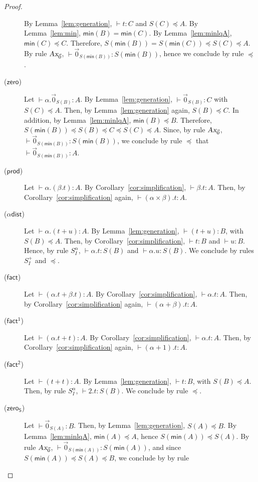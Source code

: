 \documentclass[preprint]{elsarticle}
\newcommand\pair[2]{({#1}+{#2})}
\newcommand\s[1]{\ensuremath{\mathsf{#1}}}
\newcommand\z[1][A]{\vec 0_{S(#1)}}
\newcommand\rzero{(\s{zero})}
\newcommand\rzeroS{(\s{zero_S})}
\newcommand\rprod{(\s{prod})}
\newcommand\rdists{(\s{\alpha dist})}
\newcommand\rfact{(\s{fact})}
\newcommand\rfacto{(\s{fact^1})}
\newcommand\rfactt{(\s{fact^2})}
\newcommand\tax{\textsl{Ax}}
\begin{document}
\begin{proof}
\begin{description}
    By Lemma~\ref{lem:generation}, $\vdash t:C$ and $S(C)\preceq A$.
    By Lemma~\ref{lem:min}, $\mathsf{min}(B)=\mathsf{min}(C)$. By
    Lemma~\ref{lem:minlqA}, $\mathsf{min}(C)\preceq C$. Therefore,
    $S(\mathsf{min}(B))=S(\mathsf{min}(C))\preceq S(C)\preceq A$.
    By rule $\tax_{\vec 0}$, $\vdash\z[\mathsf{min}(B)]:S(\mathsf{min}(B))$,
    hence we conclude by rule $\preceq$.
  \item[\rzero] Let $\vdash \alpha.\z[B]:A$.
    By Lemma~\ref{lem:generation}, $\vdash\z[B]:C$ with $S(C)\preceq A$.
    Then, by Lemma~\ref{lem:generation} again, $S(B)\preceq C$.
    In addition, by Lemma~\ref{lem:minlqA}, $\mathsf{min}(B)\preceq B$.
    Therefore, $S(\mathsf{min}(B))\preceq S(B)\preceq C\preceq S(C)\preceq A$.
    Since, by rule $\tax_{\vec 0}$, $\vdash\z[\mathsf{min}(B)]:S(\mathsf{min}(B))$, we
    conclude by rule $\preceq$ that $\vdash\z[\mathsf{min}(B)]:A$.
  \item[\rprod] Let $\vdash \alpha.(\beta.t):A$. By
    Corollary~\ref{cor:simplification}, $\vdash\beta.t:A$. Then, by
    Corollary~\ref{cor:simplification} again, $\vdash(\alpha\times\beta).t:A$.
  \item[\rdists] Let $\vdash \alpha.\pair tu:A$. By Lemma~\ref{lem:generation},
    $\vdash\pair tu:B$, with $S(B)\preceq A$. Then, by
    Corollary~\ref{cor:simplification}, $\vdash t:B$ and $\vdash u:B$. Hence, by
    rule $S_I^\alpha$, $\vdash\alpha.t:S(B)$ and $\vdash\alpha.u:S(B)$. We
    conclude by rules $S_I^+$ and $\preceq$.
  \item[\rfact] Let $\vdash \pair{\alpha.t}{\beta.t}:A$. By
    Corollary~\ref{cor:simplification}, $\vdash\alpha.t:A$. Then, by
    Corollary~\ref{cor:simplification} again, $\vdash(\alpha+\beta).t:A$.
  \item[\rfacto] Let $\vdash \pair{\alpha.t}{t}:A$. By
    Corollary~\ref{cor:simplification}, $\vdash\alpha.t:A$. Then, by
    Corollary~\ref{cor:simplification} again, $\vdash(\alpha+1).t:A$.
  \item[\rfactt] Let $\vdash \pair{t}{t}:A$. By Lemma~\ref{lem:generation},
    $\vdash t:B$, with $S(B)\preceq A$. Then, by rule $S_I^\alpha$, $\vdash
    2.t:S(B)$. We conclude by rule $\preceq$.
  \item[\rzeroS] Let $\vdash\z[A]:B$. Then, by Lemma~\ref{lem:generation},
    $S(A)\preceq B$.
    By Lemma~\ref{lem:minlqA}, $\mathsf{min}(A)\preceq A$, hence
    $S(\mathsf{min}(A))\preceq S(A)$.
    By rule $\tax_{\vec 0}$, $\vdash\z[\mathsf{min}(A)]:S(\mathsf{min}(A))$, and
    since $S(\mathsf{min}(A))\preceq S(A)\preceq B$, we conclude by by rule

\end{description}
\end{proof}
\end{document}
